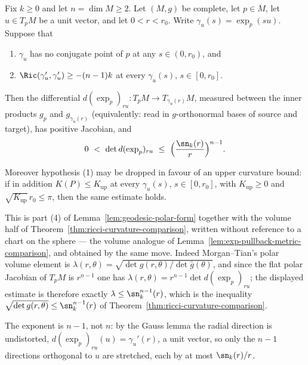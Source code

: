 \begin{lemma}
\label{lem:exp-pullback-volume-comparison}
\leanok



Fix $k\ge0$ and let $n=\dim M\ge2$. Let $(M,g)$ be complete, let $p\in M$, let
$u\in T_pM$ be a unit vector, and let $0<r<r_0$. Write
$\gamma_u(s)=\exp_p(su)$. Suppose that
\begin{enumerate}
\item $\gamma_u$ has no conjugate point of $p$ at any $s\in(0,r_0)$, and
\item $\Ric(\gamma_u',\gamma_u')\ge-(n-1)k$ at every $\gamma_u(s)$,
$s\in[0,r_0]$.
\end{enumerate}
Then the differential $d(\exp_p)_{ru}\colon T_pM\to T_{\gamma_u(r)}M$, measured
between the inner products $g_p$ and $g_{\gamma_u(r)}$ (equivalently: read in
$g$-orthonormal bases of source and target), has positive Jacobian, and
$$0\ <\ \det d(\exp_p)_{ru}\ \le\ \Bigl(\frac{\sn_{k}(r)}{r}\Bigr)^{n-1}.$$

Moreover hypothesis (1) may be dropped in favour of an upper curvature bound: if
in addition $K(P)\le K_{\mathrm{up}}$ at every $\gamma_u(s)$, $s\in[0,r_0]$, with
$K_{\mathrm{up}}\ge0$ and $\sqrt{K_{\mathrm{up}}}\,r_0\le\pi$, then the same
estimate holds.
\end{lemma}

This is part (4) of Lemma~\ref{lem:geodesic-polar-form} together with the volume
half of Theorem~\ref{thm:ricci-curvature-comparison}, written without reference
to a chart on the sphere --- the volume analogue of
Lemma~\ref{lem:exp-pullback-metric-comparison}, and obtained by the same move.
Indeed Morgan--Tian's polar volume element is
$\lambda(r,\theta)=\sqrt{\det g(r,\theta)/\det\hat g(\theta)}$, and since the
flat polar Jacobian of $T_pM$ is $r^{n-1}$ one has
$\lambda(r,\theta)=r^{n-1}\det d(\exp_p)_{ru}$; the displayed estimate is
therefore exactly $\lambda\le\sn_k^{n-1}(r)$, which is the inequality
$\sqrt{\det g(r,\theta)}\le\sn_k^{n-1}(r)$ of
Theorem~\ref{thm:ricci-curvature-comparison}.

The exponent is $n-1$, not $n$: by the Gauss lemma the radial direction is
undistorted, $d(\exp_p)_{ru}(u)=\gamma_u'(r)$, a unit vector, so only the $n-1$
directions orthogonal to $u$ are stretched, each by at most $\sn_k(r)/r$.

